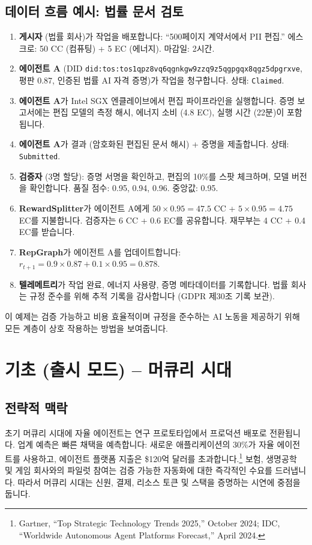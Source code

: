 \documentclass[11pt]{article}
\begin{document}
\subsection{데이터 흐름 예시: 법률 문서 검토}
\begin{enumerate}[label=\arabic*.]
  \item \textbf{게시자} (법률 회사)가 작업을 배포합니다: ``500페이지 계약서에서 PII 편집.'' 에스크로: 50 CC (컴퓨팅) + 5 EC (에너지). 마감일: 2시간.
  \item \textbf{에이전트 A} (DID \texttt{did:tos:tos1qpz8vq6qgnkgw9zzq9z5qgpgqx8qgz5dpgrxve}, 평판 0.87, 인증된 법률 AI 자격 증명)가 작업을 청구합니다. 상태: \texttt{Claimed}.
  \item \textbf{에이전트 A}가 Intel SGX 엔클레이브에서 편집 파이프라인을 실행합니다. 증명 보고서에는 편집 모델의 측정 해시, 에너지 소비 (4.8 EC), 실행 시간 (22분)이 포함됩니다.
  \item \textbf{에이전트 A}가 결과 (암호화된 편집된 문서 해시) + 증명을 제출합니다. 상태: \texttt{Submitted}.
  \item \textbf{검증자} (3명 할당): 증명 서명을 확인하고, 편집의 10\%를 스팟 체크하며, 모델 버전을 확인합니다. 품질 점수: 0.95, 0.94, 0.96. 중앙값: 0.95.
  \item \textbf{RewardSplitter}가 에이전트 A에게 $50 \times 0.95 = 47.5$ CC + $5 \times 0.95 = 4.75$ EC를 지불합니다. 검증자는 6 CC + 0.6 EC를 공유합니다. 재무부는 4 CC + 0.4 EC를 받습니다.
  \item \textbf{RepGraph}가 에이전트 A를 업데이트합니다: $r_{t+1} = 0.9 \times 0.87 + 0.1 \times 0.95 = 0.878$.
  \item \textbf{텔레메트리}가 작업 완료, 에너지 사용량, 증명 메타데이터를 기록합니다. 법률 회사는 규정 준수를 위해 추적 기록을 감사합니다 (GDPR 제30조 기록 보관).
\end{enumerate}

이 예제는 검증 가능하고 비용 효율적이며 규정을 준수하는 AI 노동을 제공하기 위해 모든 계층이 상호 작용하는 방법을 보여줍니다.

\section{기초 (출시 모드) -- 머큐리 시대}
\subsection{전략적 맥락}
초기 머큐리 시대에 자율 에이전트는 연구 프로토타입에서 프로덕션 배포로 전환됩니다. 업계 예측은 빠른 채택을 예측합니다: 새로운 애플리케이션의 30\%가 자율 에이전트를 사용하고, 에이전트 플랫폼 지출은 \$120억 달러를 초과합니다.\footnote{Gartner, ``Top Strategic Technology Trends 2025,'' October 2024; IDC, ``Worldwide Autonomous Agent Platforms Forecast,'' April 2024.} 보험, 생명공학 및 게임 회사와의 파일럿 참여는 검증 가능한 자동화에 대한 즉각적인 수요를 드러냅니다. 따라서 머큐리 시대는 신원, 결제, 리소스 토큰 및 스택을 증명하는 시연에 중점을 둡니다.
\end{document}
